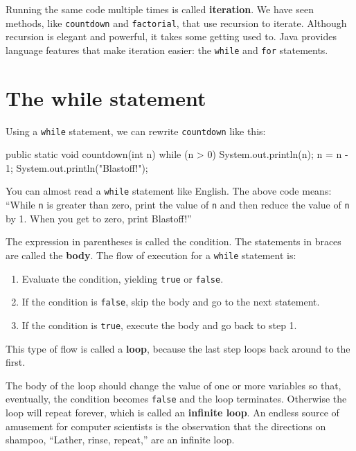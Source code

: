 \documentclass[12pt]{book}
\theoremstyle{exercise}
\newcommand{\java}[1]{\verb"#1"}
\begin{document}
Running the same code multiple times is called {\bf iteration}.
We have seen methods, like \java{countdown} and \java{factorial}, that use recursion to iterate.
Although recursion is elegant and powerful, it takes some getting used to.
Java provides language features that make iteration easier:
the \java{while} and \java{for} statements.


\section{The while statement}


Using a \java{while} statement, we can rewrite \java{countdown} like this:

\begin{code}
    public static void countdown(int n) {
        while (n > 0) {
            System.out.println(n);
            n = n - 1;
        }
        System.out.println("Blastoff!");
    }
\end{code}

You can almost read a \java{while} statement like English.
The above code means: ``While \java{n} is greater than zero, print the value of \java{n} and then reduce the value of \java{n} by 1.
When you get to zero, print Blastoff!''

The expression in parentheses is called the condition.
The statements in braces are called the {\bf body}.
The flow of execution for a \java{while} statement is:

\begin{enumerate}

\item Evaluate the condition, yielding \java{true} or \java{false}.

\item If the condition is \java{false}, skip the body and go to the next statement.

\item If the condition is \java{true}, execute the body and go back to step 1.

\end{enumerate}


This type of flow is called a {\bf loop}, because the last step loops back around to the first.

The body of the loop should change the value of one or more variables so that, eventually, the condition becomes \java{false} and the loop terminates.
Otherwise the loop will repeat forever, which is called an {\bf infinite loop}.
An endless source of amusement for computer scientists is the observation that the directions on shampoo, ``Lather, rinse, repeat,'' are an infinite loop.
\end{document}
